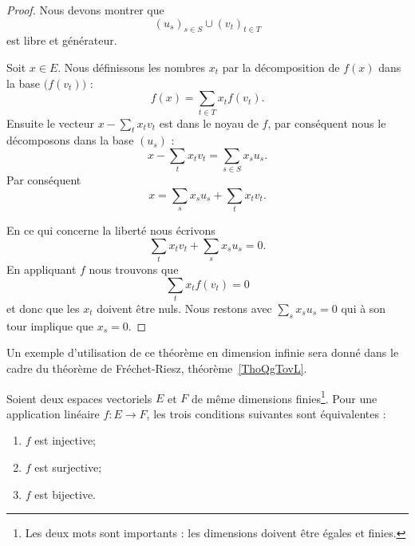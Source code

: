 \begin{proof}
    Nous devons montrer que
    \begin{equation}
          (u_s)_{s\in S}\cup (v_t)_{t\in T}
    \end{equation}
    est libre et générateur.

    Soit \( x\in E\). Nous définissons les nombres \( x_t\) par la décomposition de \( f(x)\) dans la base \( \big( f(v_t) \big)\) :
    \begin{equation}
        f(x)=\sum_{t\in T}x_tf(v_t).
    \end{equation}
    Ensuite le vecteur \( x - \sum_tx_tv_t\) est dans le noyau de \( f\), par conséquent nous le décomposons dans la base \( (u_s)\) :
    \begin{equation}
        x-\sum_tx_tv_t=\sum_{s\in S} x_su_s.
    \end{equation}
    Par conséquent
    \begin{equation}
        x=\sum_sx_su_s+\sum_tx_tv_t.
    \end{equation}

    En ce qui concerne la liberté nous écrivons
    \begin{equation}
        \sum_tx_tv_t+\sum_sx_su_s=0.
    \end{equation}
    En appliquant \( f\) nous trouvons que
    \begin{equation}
        \sum_tx_tf(v_t)=0
    \end{equation}
    et donc que les \( x_t\) doivent être nuls. Nous restons avec \( \sum_sx_su_s=0\) qui à son tour implique que \( x_s=0\).
\end{proof}
Un exemple d'utilisation de ce théorème en dimension infinie sera donné dans le cadre du théorème de Fréchet-Riesz, théorème~\ref{ThoQgTovL}.

\begin{corollary}       \label{CORooCCXHooALmxKk}
    Soient deux espaces vectoriels \( E\) et \( F\) de même dimensions finies\footnote{Les deux mots sont importants : les dimensions doivent être égales et finies.}. Pour une application linéaire \( f\colon E\to F\), les trois conditions suivantes sont équivalentes :
    \begin{enumerate}
        \item
            \( f\) est injective;
        \item
            \( f\) est surjective;
        \item
            \( f\) est bijective.
    \end{enumerate}
\end{corollary}

